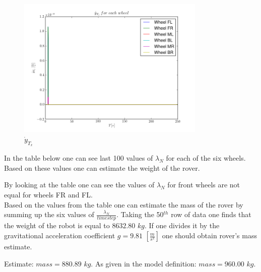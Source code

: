 \begin{figure}[H]
  \centering
    \includegraphics[width=0.8\textwidth]{yTzdot}
  \caption{$\dot{y}_{T_x}$}
\end{figure}

\noindent In the table below one can see last 100 values of $\lambda_{N}$ for each of the six wheels. Based on these values one can estimate the weight of the 
rover. 

\noindent By looking at the table one can see the values of $\lambda_{N}$ for front wheels are not equal for wheels FR and FL.\\

\noindent Based on the values from the table one can estimate the mass of the rover by summing up the six values of $\frac{\lambda_N}{timestep}$. Taking the 50$^{th}$ row of data
one finds that the weight of the robot is equal to $8632.80$ $kg$. If one divides it by the gravitational acceleration coefficient $g = 9.81$ $[\frac{m}{s^2}]$ one should obtain rover's mass estimate.

\noindent Estimate: $mass = 880.89$ $kg$. As given in the model definition: $mass = 960.00$ $kg$. 

